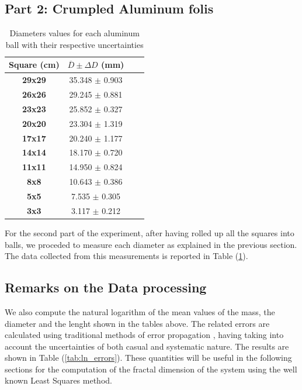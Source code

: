 \documentclass[a4paper,12pt]{article}
\begin{document}
\subsection{Part 2: Crumpled Aluminum folis}
\begin{table}[h!] 
    \centering
    \begin{tabular}{|c|c|c|c|}
    \hline
        \textbf{Square (cm)} & \( \overline{D} \pm \Delta D \) (mm) \\ \hline 
        \textbf{29x29} & 35.348 \(\pm\) 0.903              \\ \hline
        \textbf{26x26} & 29.245 \(\pm\) 0.881              \\ \hline
        \textbf{23x23} & 25.852 \(\pm\) 0.327              \\ \hline
        \textbf{20x20} & 23.304 \(\pm\) 1.319              \\ \hline
        \textbf{17x17} & 20.240 \(\pm\) 1.177              \\ \hline
        \textbf{14x14} & 18.170 \(\pm\) 0.720              \\ \hline
        \textbf{11x11} & 14.950 \(\pm\) 0.824              \\ \hline
        \textbf{8x8}   & 10.643 \(\pm\) 0.386              \\ \hline
        \textbf{5x5}   & 7.535  \(\pm\) 0.305              \\ \hline
        \textbf{3x3}   & 3.117 \(\pm\) 0.212               \\ \hline
    \end{tabular}
    \caption{Diameters values for each aluminum ball with their respective uncertainties}
    \label{tab:balls}
\end{table}

For the second part of the experiment, after having rolled up all the squares into balls, we proceded to measure each diameter as explained in the previous section. The data collected from this measurements is reported in Table (\ref{tab:balls}).




\subsection{Remarks on the Data processing} 
We also compute the natural logarithm of the mean values of the mass, the diameter and the lenght shown in the tables above. The related errors are calculated using traditional methods of error propagation \cite{taylor-1997}, having taking into account the uncertainties of both casual and systematic nature. The results are shown in Table (\ref{tab:ln_errors}). These quantities will be useful in the following sections for the computation of the fractal dimension of the system using the well known Least Squares method.
\end{document}
